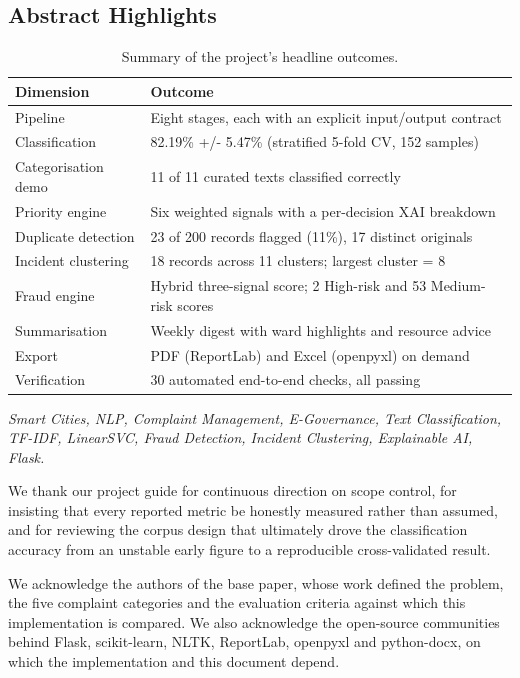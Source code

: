 \documentclass[10pt,letterpaper,oneside]{article}\usepackage{geometry}\geometry{top=1in,bottom=1in,left=1in,right=1in,includeheadfoot}\usepackage{xcolor}\definecolor{color@navy}{HTML}{1F3B63}\definecolor{color@grey}{HTML}{404040}\definecolor{color@hdr}{HTML}{F2F4F7}\usepackage{titlesec}\titleformat{\section}  {\normalfont\huge\bfseries\color@navy}  {}{0pt}{\MakeUppercase}\titleformat{\subsection}  {\normalfont\Large\bfseries\color@navy}  {}{0pt}{}\titleformat{\subsubsection}  {\normalfont\large\bfseries\color@navy}  {}{0pt}{}\titlespacing*{\section}{0pt}{14pt}{6pt}\titlespacing*{\subsection}{0pt}{10pt}{4pt}\titlespacing*{\subsubsection}{0pt}{8pt}{3pt}\setlength{\parindent}{0pt}\setlength{\parskip}{0.6em}\parindent=0pt\usepackage{enumitem}\setlist{nosep,leftmargin=*,itemsep=0pt,topsep=2pt,partopsep=0pt}\usepackage{array}\usepackage{booktabs}\usepackage{caption}\captionsetup{font={small,it},labelfont={bf},labelsep=period,  parskip=2pt,skip=4pt,list=no}\captionsetup[table]{labelfont={bf,small,color@navy},name=Table}\usepackage{graphicx}\usepackage{verbatim}\usepackage{ragged2e}\usepackage{longtable}\usepackage{tabularx}\usepackage{multirow}\usepackage{colortbl}\definecolor{rowshade}{HTML}{F2F4F7}\usepackage{tikz}\usetikzlibrary{positioning,calc}\usepackage[hidelinks]{hyperref}\hypersetup{colorlinks=true,linkcolor=color@navy,urlcolor=color@navy}\pagestyle{fancy}\fancyhf{}\renewcommand{\headrulewidth}{0.4pt}\fancyhead[L]{\small\color@navy CivicSense — Project Report}\fancyhead[R]{\small\color@grey October 11, 2026}\fancyfoot[C]{\small\color@grey An Integrated Intelligent Triage Pipelin}\fancyfoot[R]{\small\color@grey Page \thepage}\usepackage{setspace}\setstretch{1.15}\AtBeginDocument{  \hypersetup{pdftitle={An Integrated Intelligent Triage Pipeline for AI-Enhanced Citizen Complaint Management},    pdfauthor={CivicSense Project Team},    pdfsubject={Project Report},    pdfkeywords={smart cities, NLP, complaint management, e-governance},    pdfcreator={CivicSense Project Team}  }}
\begin{document}
\subsection*{Abstract Highlights}
\begin{table}[htbp]
\centering
\small
\begin{tabular}{@{}ll@{}}
\toprule
Dimension & Outcome \\
\midrule
Pipeline & Eight stages, each with an explicit input/output contract \\
Classification & 82.19\% +/- 5.47\% (stratified 5-fold CV, 152 samples) \\
Categorisation demo & 11 of 11 curated texts classified correctly \\
Priority engine & Six weighted signals with a per-decision XAI breakdown \\
Duplicate detection & 23 of 200 records flagged (11\%), 17 distinct originals \\
Incident clustering & 18 records across 11 clusters; largest cluster = 8 \\
Fraud engine &  Hybrid three-signal score; 2 High-risk and 53 Medium-risk scores \\
Summarisation & Weekly digest with ward highlights and resource advice \\
Export & PDF (ReportLab) and Excel (openpyxl) on demand \\
Verification & 30 automated end-to-end checks, all passing \\
\bottomrule
\end{tabular}
\caption{Summary of the project’s headline outcomes.}
\end{table}

\emph{Smart Cities, NLP, Complaint Management, E-Governance, Text Classification, TF-IDF, LinearSVC, Fraud Detection, Incident Clustering, Explainable AI, Flask.}

\clearpage
{}

We thank our project guide for continuous direction on scope control, for insisting that every reported metric be honestly measured rather than assumed, and for reviewing the corpus design that ultimately drove the classification accuracy from an unstable early figure to a reproducible cross-validated result.

We acknowledge the authors of the base paper, whose work defined the problem, the five complaint categories and the evaluation criteria against which this implementation is compared. We also acknowledge the open-source communities behind Flask, scikit-learn, NLTK, ReportLab, openpyxl and python-docx, on which the implementation and this document depend.
\end{document}

